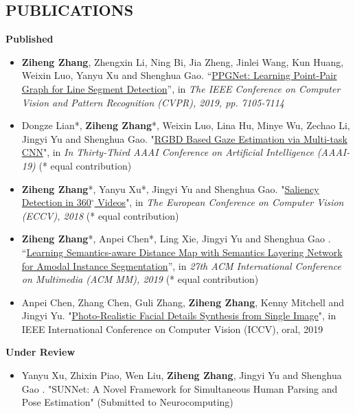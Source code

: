 \documentclass[11pt,a4paper,palatine]{moderncv}        %
\begin{document}
\begin{CJK*}{UTF8}{gbsn}
\section{PUBLICATIONS}
\textbf{Published}
  {\begin{itemize}
    \item  \textbf{Ziheng Zhang}, Zhengxin Li, Ning Bi, Jia Zheng, Jinlei Wang, Kun Huang, Weixin Luo, Yanyu Xu and Shenghua Gao. “\href{https://www.aiyoggle.me/publication/ppgnet-cvpr19/ppgnet-cvpr19.pdf}{PPGNet: Learning Point-Pair Graph for Line Segment Detection}”, in \textit{The IEEE Conference on Computer Vision and Pattern Recognition (CVPR), 2019, pp. 7105-7114}
    \item Dongze Lian*, \textbf{Ziheng Zhang}*, Weixin Luo, Lina Hu, Minye Wu, Zechao Li, Jingyi Yu and Shenghua Gao. "\href{https://www.aiyoggle.me/publication/gaze-aaai19/gaze-aaai19.pdf}{RGBD Based Gaze Estimation via Multi-task CNN}", in \textit{In Thirty-Third AAAI Conference on Artificial Intelligence (AAAI-19)} (* equal contribution)
    \item \textbf{Ziheng Zhang}*, Yanyu Xu*, Jingyi Yu and Shenghua Gao. "\href{http://openaccess.thecvf.com/content_ECCV_2018/papers/Ziheng_Zhang_Saliency_Detection_in_ECCV_2018_paper.pdf}{Saliency Detection in 360$^\circ$ Videos}", in \textit{The European Conference on Computer Vision (ECCV), 2018} (* equal contribution)
    \item  \textbf{Ziheng Zhang}*, Anpei Chen*, Ling Xie, Jingyi Yu and Shenghua Gao . “\href{https://arxiv.org/pdf/1905.12898}{Learning Semantics-aware Distance Map with Semantics Layering Network for Amodal Instance Segmentation}”, in \textit{27th ACM International Conference on Multimedia (ACM MM), 2019} (* equal contribution)
    \item Anpei Chen, Zhang Chen, Guli Zhang, \textbf{Ziheng Zhang}, Kenny Mitchell and Jingyi Yu. "\href{https://arxiv.org/pdf/1903.10873}{Photo-Realistic Facial Details Synthesis from Single Image}", in IEEE International Conference on Computer Vision (ICCV), oral, 2019
  \end{itemize}
  }
\textbf{Under Review}
  {\begin{itemize}
    \item Yanyu Xu, Zhixin Piao, Wen Liu, \textbf{Ziheng Zhang}, Jingyi Yu and Shenghua Gao . "SUNNet: A Novel Framework for Simultaneous Human Parsing and Pose Estimation" (Submitted to Neurocomputing)
  \end{itemize}
  }

    

\end{CJK*}
\end{document}
